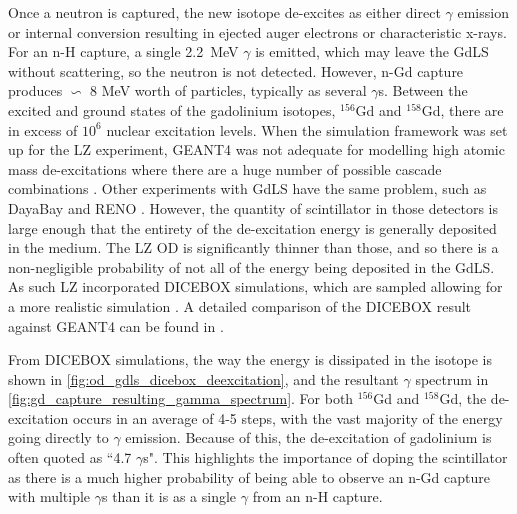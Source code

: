 \par
Once a neutron is captured, the new isotope de-excites as either direct $\gamma$ emission or internal conversion resulting in ejected auger electrons or characteristic x-rays.
For an n-H capture, a single 2.2~MeV $\gamma$ is emitted, which may leave the GdLS without scattering, so the neutron is not detected.
However, n-Gd capture produces $\backsim$ 8 MeV worth of particles, typically as several $\gamma$s.
Between the excited and ground states of the gadolinium isotopes, ${}^{156}$Gd and ${}^{158}$Gd, there are in excess of $10^{6}$ nuclear excitation levels.
When the simulation framework was set up for the LZ experiment, GEANT4 was not adequate for modelling high atomic mass de-excitations where there are a huge number of possible cascade combinations \cite{ucsb_gdls_dicebox_simulations_ref}.
Other experiments with GdLS have the same problem, such as DayaBay \cite{dayabay_overview_ref} and RENO \cite{reno_overview_ref}.
However, the quantity of scintillator in those detectors is large enough that the entirety of the de-excitation energy is generally deposited in the medium.
The LZ OD is significantly thinner than those, and so there is a non-negligible probability of not all of the energy being deposited in the GdLS.
As such LZ incorporated DICEBOX \cite{dicebox_simulations_ref} simulations, which are sampled allowing for a more realistic simulation \cite{lz_simulations_ref}.
A detailed comparison of the DICEBOX result against GEANT4 can be found in \cite{ucsb_gdls_dicebox_simulations_ref}.
\par
From DICEBOX simulations, the way the energy is dissipated in the isotope is shown in \autoref{fig:od_gdls_dicebox_deexcitation}, and the resultant $\gamma$ spectrum in \autoref{fig:gd_capture_resulting_gamma_spectrum}.
For both ${}^{156}$Gd and ${}^{158}$Gd, the de-excitation occurs in an average of 4-5 steps, with the vast majority of the energy going directly to $\gamma$ emission.
Because of this, the de-excitation of gadolinium is often quoted as ``4.7 $\gamma$s".
This highlights the importance of doping the scintillator as there is a much higher probability of being able to observe an n-Gd capture with multiple $\gamma$s than it is as a single $\gamma$ from an n-H capture.



